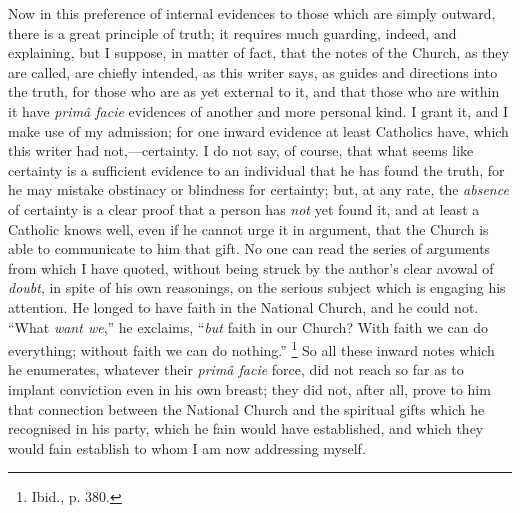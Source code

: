 Now in this preference of internal evidences to those which are
simply outward, there is a great principle of truth; it requires much
guarding, indeed, and explaining, but I suppose, in matter of fact,
that the notes of the Church, as they are called, are chiefly
intended, as this writer says, as guides and directions into the
truth, for those who are as yet external to it, and that those who are
within it have \emph{primâ facie} evidences of another and more
personal kind. I grant it, and I make use of my admission; for one
inward evidence at least Catholics have, which this writer had not,—certainty.
I do not say, of course, that what seems like certainty is a
sufficient evidence to an individual that he has found the truth, for
he may mistake obstinacy or blindness for certainty; but, at any rate,
the \emph{absence} of certainty is a clear proof that a person has \emph{not} yet
found it, and at least a Catholic knows well, even if he cannot urge
it in argument, that the Church is able to communicate to him that
gift. No one can read the series of arguments from which I have
quoted, without being struck by the author's clear avowal of \emph{doubt}, in
spite of his own reasonings, on the serious subject which is engaging
his attention. He longed to have faith in the National Church, and he
could not. ``What \emph{want we},'' he exclaims, ``\emph{but} faith in
our Church? With faith we can do everything; without faith we can do
nothing.'' \footnote{Ibid., p. 380.} So all
these inward notes which he enumerates, whatever their \emph{primâ facie}
force, did not reach so far as to implant conviction even in his own
breast; they did not, after all, prove to him that connection between
the National Church and the spiritual gifts which he recognised in his
party, which he fain would have established, and which they would fain
establish to whom I am now addressing myself.

